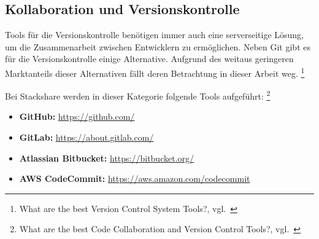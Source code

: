 \subsection{Kollaboration und Versionskontrolle}\label{collaboration_vcs}

Tools für die Versionskontrolle benötigen immer auch eine serverseitige Lösung, um die Zusammenarbeit zwischen Entwicklern zu ermöglichen.
Neben Git gibt es für die Versionskontrolle einige Alternative.
Aufgrund des weitaus geringeren Marktanteils dieser Alternativen fällt deren Betrachtung in dieser Arbeit weg.
\footnote{What are the best Version Control System Tools?, vgl.~\cite{STACKSHARE_VCS}}

Bei Stackshare werden in dieser Kategorie folgende Tools aufgeführt:
\footnote{What are the best Code Collaboration and Version Control Tools?, vgl.~\cite{STACKSHARE_CODE_COLLABORATION}}

\begin{itemize}
    \item \textbf{GitHub:} \href{https://github.com/}{https://github.com/}
    \item \textbf{GitLab:} \href{https://about.gitlab.com/}{https://about.gitlab.com/}
    \item \textbf{Atlassian Bitbucket:} \href{https://bitbucket.org/}{https://bitbucket.org/}
    \item \textbf{AWS CodeCommit:} \href{https://aws.amazon.com/codecommit}{https://aws.amazon.com/codecommit}
\end{itemize}


%

